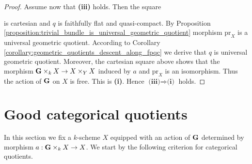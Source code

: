 \begin{proof}
Assume now that \textbf{(iii)} holds. Then the square
\begin{center}
\end{center}
is cartesian and $q$ is faithfully flat and quasi-compact. By Proposition \ref{proposition:trivial_bundle_is_universal_geometric_quotient} morphism $\mathrm{pr}_X$ is a universal geometric quotient. According to Corollary \ref{corollary:geometric_quotients_descent_along_fpqc} we derive that $q$ is universal geometric quotient. Moreover, the cartesian square above shows that the morphism $\mathbf{G}\times_kX\rightarrow X\times_YX$ induced by $a$ and $\mathrm{pr}_X$ is an isomorphism. Thus the action of $\mathbf{G}$ on $X$ is free. This is \textbf{(i)}. Hence $\textbf{(iii)}\Rightarrow \textbf{(i)}$ holds.
\end{proof}

\section{Good categorical quotients}
\noindent
\noindent
In this section we fix a $k$-scheme $X$ equipped with an action of $\mathbf{G}$ determined by morphism $a:\mathbf{G}\times_kX\rightarrow X$. We start by the following criterion for categorical quotients.

